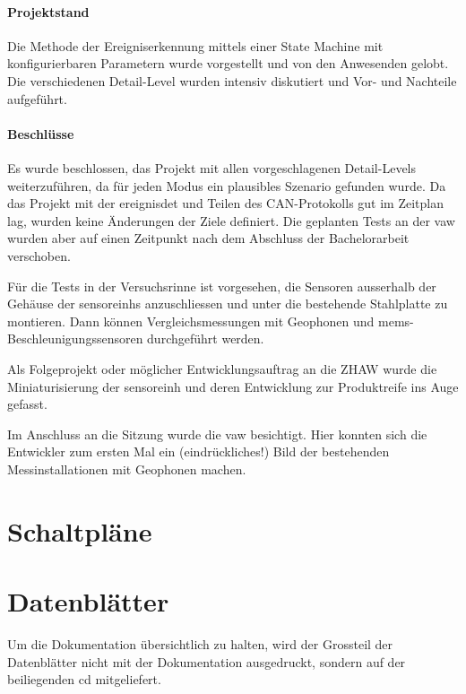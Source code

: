 \paragraph{Projektstand} Die Methode der Ereigniserkennung mittels einer State Machine mit konfigurierbaren Parametern wurde vorgestellt und von den Anwesenden gelobt. Die verschiedenen Detail-Level wurden intensiv diskutiert und Vor- und Nachteile aufgeführt. 

\paragraph{Beschlüsse} Es wurde beschlossen, das Projekt mit allen vorgeschlagenen Detail-Levels weiterzuführen, da für jeden Modus ein plausibles Szenario gefunden wurde. Da das Projekt mit der \gls{ereignisdet} und Teilen des CAN-Protokolls gut im Zeitplan lag, wurden keine Änderungen der Ziele definiert. Die geplanten Tests an der \gls{vaw} wurden aber auf einen Zeitpunkt nach dem Abschluss der Bachelorarbeit verschoben.

Für die Tests in der Versuchsrinne ist vorgesehen, die Sensoren ausserhalb der Gehäuse der \glspl{sensoreinh} anzuschliessen und unter die bestehende Stahlplatte zu montieren. Dann können Vergleichsmessungen mit Geophonen und \gls{mems}-Beschleunigungssensoren durchgeführt werden.

Als Folgeprojekt oder möglicher Entwicklungsauftrag an die ZHAW wurde die Miniaturisierung  der \gls{sensoreinh} und deren Entwicklung zur Produktreife ins Auge gefasst.

Im Anschluss an die Sitzung wurde die \gls{vaw} besichtigt. Hier konnten sich die Entwickler zum ersten Mal ein (eindrückliches!) Bild der bestehenden Messinstallationen mit Geophonen machen.

\section{Schaltpläne}\label{app.pcb}




\section{Datenblätter}\label{app.datasheets}
Um die Dokumentation übersichtlich zu halten, wird der Grossteil der Datenblätter nicht mit der Dokumentation ausgedruckt, sondern auf der beiliegenden \gls{cd} mitgeliefert.


